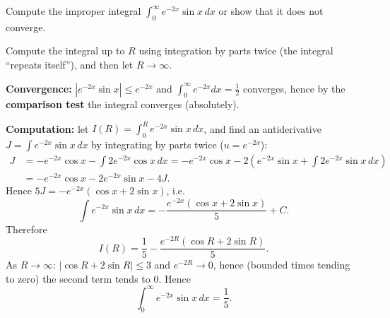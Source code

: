 
\begin{question}
Compute the improper integral $\displaystyle\int_0^{\infty}e^{-2x}\sin x\,dx$ or show that it does not converge.
\end{question}

\begin{hint}
Compute the integral up to $R$ using integration by parts twice (the integral ``repeats itself''), and then let $R\to\infty$.
\end{hint}

\begin{solution}
\textbf{Convergence:} $|e^{-2x}\sin x|\le e^{-2x}$ and $\int_0^\infty e^{-2x}dx=\frac12$ converges, hence by the \textbf{comparison test} the integral converges (absolutely).

\textbf{Computation:} let $I(R)=\int_0^R e^{-2x}\sin x\,dx$, and find an antiderivative $J=\int e^{-2x}\sin x\,dx$ by integrating by parts twice ($u=e^{-2x}$):
\begin{align*}
J&=-e^{-2x}\cos x-\int 2e^{-2x}\cos x\,dx
 =-e^{-2x}\cos x-2\left(e^{-2x}\sin x+\int 2e^{-2x}\sin x\,dx\right)\\
 &=-e^{-2x}\cos x-2e^{-2x}\sin x-4J.
\end{align*}
Hence $5J=-e^{-2x}(\cos x+2\sin x)$, i.e.
\[ \int e^{-2x}\sin x\,dx=-\frac{e^{-2x}(\cos x+2\sin x)}{5}+C. \]
Therefore
\[ I(R)=\frac{1}{5}-\frac{e^{-2R}(\cos R+2\sin R)}{5}. \]
As $R\to\infty$: $|\cos R+2\sin R|\le 3$ and $e^{-2R}\to 0$, hence (bounded times tending to zero) the second term tends to $0$. Hence
\[ \int_0^\infty e^{-2x}\sin x\,dx=\frac15. \]
\end{solution}
